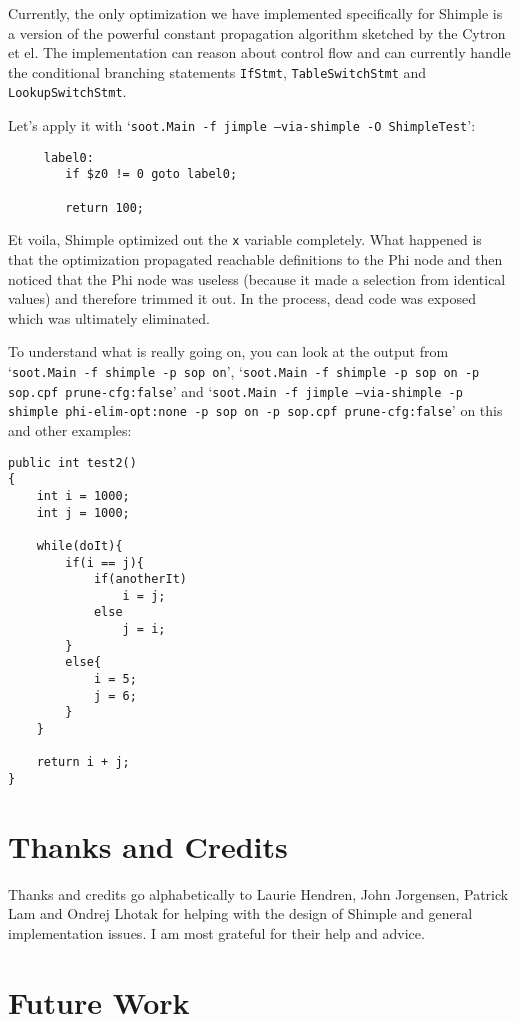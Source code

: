 \documentclass[10pt,letterpaper,oneside,onecolumn]{article}
\begin{document}
Currently, the only optimization we have implemented specifically for
Shimple is a version of the powerful constant propagation algorithm
sketched by the Cytron et el.  The implementation can reason about
control flow and can currently handle the conditional branching
statements {\tt IfStmt}, {\tt TableSwitchStmt} and {\tt
LookupSwitchStmt}.

Let's apply it with `{\tt soot.Main -f jimple --via-shimple -O
ShimpleTest}':

\begin{verbatim}
     label0:
        if $z0 != 0 goto label0;

        return 100;
\end{verbatim}

Et voila, Shimple optimized out the {\tt x} variable completely. What
happened is that the optimization propagated reachable definitions to
the Phi node and then noticed that the Phi node was useless (because
it made a selection from identical values) and therefore trimmed it
out.  In the process, dead code was exposed which was ultimately
eliminated.

To understand what is really going on, you can look at the output from
`{\tt soot.Main -f shimple -p sop on}', `{\tt soot.Main -f shimple -p sop
on -p sop.cpf prune-cfg:false}' and `{\tt soot.Main -f jimple
--via-shimple -p shimple phi-elim-opt:none -p sop on -p sop.cpf
prune-cfg:false}' on this and other examples:

\begin{verbatim}
public int test2()
{
    int i = 1000;
    int j = 1000;

    while(doIt){
        if(i == j){
            if(anotherIt)
                i = j;
            else
                j = i;
        }
        else{
            i = 5;
            j = 6;
        }
    }

    return i + j;
}
\end{verbatim}

\section{Thanks and Credits}

Thanks and credits go alphabetically to Laurie Hendren, John
Jorgensen, Patrick Lam and Ondrej Lhotak for helping with the design
of Shimple and general implementation issues.  I am most grateful for
their help and advice.

\section{Future Work}
\end{document}
